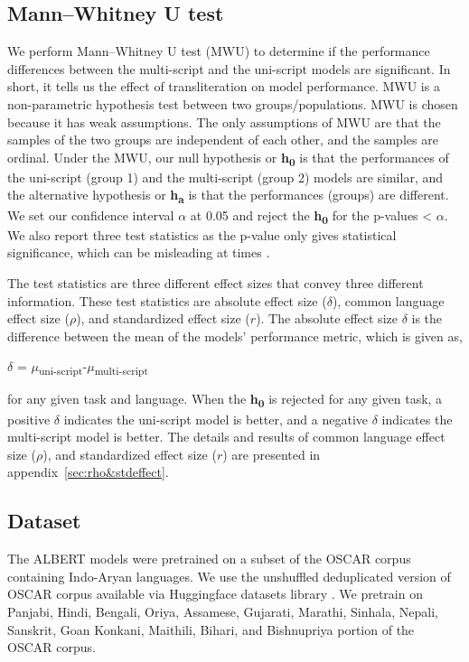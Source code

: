 \documentclass[11pt]{article}
\begin{document}
\subsection{Mann–Whitney U test}
\label{statistical-analysis}
We perform Mann–Whitney U test (MWU) \citep{10.1214/aoms/1177730491, Wilcoxon1945} to determine if the performance differences between the multi-script and the uni-script models are significant. In short, it tells us the effect of transliteration on model performance. 
MWU is a non-parametric hypothesis test between two groups/populations. MWU is chosen because it has weak assumptions. The only assumptions of MWU are that the samples of the two groups are independent of each other, and the samples are ordinal. Under the MWU, our null hypothesis or \textbf{h\textsubscript{0}} is that the performances of the uni-script (group 1) and the multi-script (group 2) models are similar, and the alternative hypothesis or \textbf{h\textsubscript{a}} is that the performances (groups) are different. We set our confidence interval \(\alpha\) at 0.05 and reject the \textbf{h\textsubscript{0}} for the p-values < \(\alpha\). We also report three test statistics as the p-value only gives statistical significance, which can be misleading at times \citep{pmid23997866}.

The test statistics are three different effect sizes that convey three different information. These test statistics are absolute effect size ($\delta$), common language effect size ($\rho$), and standardized effect size ($r$). The absolute effect size $\delta$ is the difference between the mean of the models' performance metric, which is given as, 
\begin{center}$\delta$ = $\mu$\textsubscript{uni-script}-$\mu$\textsubscript{multi-script}\end{center}
for any given task and language. When the \textbf{h\textsubscript{0}} is rejected for any given task, a positive $\delta$ indicates the uni-script model is better, and a negative $\delta$ indicates the multi-script model is better. The details and results of common language effect size ($\rho$), and standardized effect size ($r$) are presented in appendix~\ref{sec:rho&stdeffect}.
\subsection{Dataset}
\label{dataset}
The ALBERT models were pretrained on a subset of the OSCAR corpus containing Indo-Aryan languages.
We use the unshuffled deduplicated version of OSCAR corpus \citep{OrtizSuarezSagotRomary2019} available via Huggingface datasets library \citep{lhoest-etal-2021-datasets}. We pretrain on Panjabi, Hindi, Bengali, Oriya, Assamese, Gujarati, Marathi, Sinhala, Nepali, Sanskrit, Goan Konkani, Maithili, Bihari, and Bishnupriya portion of the OSCAR corpus.
\end{document}
